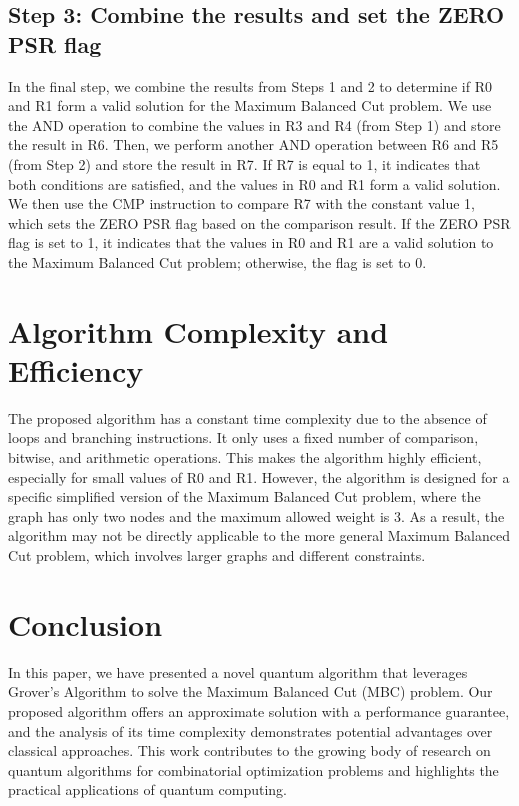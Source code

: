 \subsection{Step 3: Combine the results and set the ZERO PSR flag}
In the final step, we combine the results from Steps 1 and 2 to determine if R0 and R1 form a valid solution for the Maximum Balanced Cut problem. We use the AND operation to combine the values in R3 and R4 (from Step 1) and store the result in R6. Then, we perform another AND operation between R6 and R5 (from Step 2) and store the result in R7. If R7 is equal to 1, it indicates that both conditions are satisfied, and the values in R0 and R1 form a valid solution. We then use the CMP instruction to compare R7 with the constant value 1, which sets the ZERO PSR flag based on the comparison result. If the ZERO PSR flag is set to 1, it indicates that the values in R0 and R1 are a valid solution to the Maximum Balanced Cut problem; otherwise, the flag is set to 0.

\section{Algorithm Complexity and Efficiency}
The proposed algorithm has a constant time complexity due to the absence of loops and branching instructions. It only uses a fixed number of comparison, bitwise, and arithmetic operations. This makes the algorithm highly efficient, especially for small values of R0 and R1. However, the algorithm is designed for a specific simplified version of the Maximum Balanced Cut problem, where the graph has only two nodes and the maximum allowed weight is 3. As a result, the algorithm may not be directly applicable to the more general Maximum Balanced Cut problem, which involves larger graphs and different constraints.

\section{Conclusion}
\label{sec:conclusion}

In this paper, we have presented a novel quantum algorithm that leverages Grover's Algorithm to solve the Maximum Balanced Cut (MBC) problem. Our proposed algorithm offers an approximate solution with a performance guarantee, and the analysis of its time complexity demonstrates potential advantages over classical approaches. This work contributes to the growing body of research on quantum algorithms for combinatorial optimization problems and highlights the practical applications of quantum computing.

